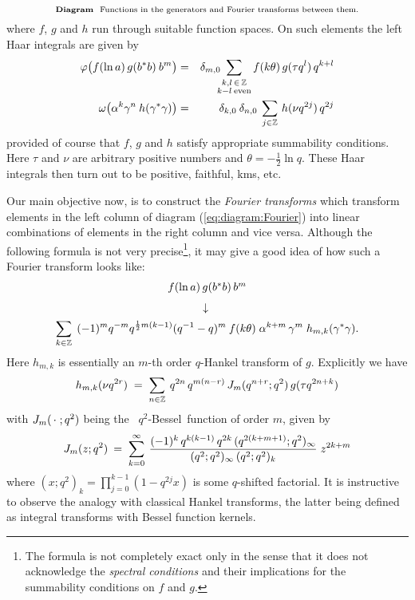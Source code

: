 \begin{equation}\label{eq:diagram:Fourier}
\mbox{\scriptsize {\bf Diagram}\hspace{3pt}\ Functions in the generators and Fourier transforms between them.}
\end{equation}
where $f$, $g$ and $h$ run through suitable function spaces.
On such elements the left Haar integrals are given by
\begin{eqnarray*}
  \varphi \!\left(  f(\ln a)\, g(b^* b)\: b^m  \vertM\right)
     &=& \delta_{m,0} \!\!\! \sum_{\stackrel{\scriptstyle k,l\,\in\, \ZZ}{\scriptstyle k-l\: {\rm even}}}
            f(k \theta) \, g(\tau q^l) \, q^{k+l}  \\
  \omega \!\left(\alpha^k \gamma^n \:  h(\gamma^*\gamma)\vertM\right)
           &=& \delta_{k,0}\:\delta_{n,0} \: \sum_{j\in\ZZ} \, h(\nu q^{2j})\, q^{2j}
\end{eqnarray*}
provided of course that $f$, $g$ and $h$ satisfy appropriate summability conditions.
Here $\tau$ and $\nu$ are arbitrary positive numbers and \mbox{$\theta = -\frac{1}{2} \ln q$}\@.
These Haar integrals then turn out to be positive, faithful, {\sc kms}, etc.
\vspace{1ex}

Our main objective now, is to construct the {\em Fourier transforms\/} which
transform elements in the left column of diagram (\ref{eq:diagram:Fourier})
into linear combinations of elements in the right column and vice versa.
Although the following formula is not very
precise\footnote{The formula is not completely exact only in the sense that it does
not acknowledge the {\em spectral conditions\/} and their
implications for the summability conditions on $f$ and $g$.},
it may give a good idea of how such a Fourier transform looks like:
$$ \begin{array}{c}
    f(\ln a)\, g(b^* b)\, b^m
\\
\downarrow\vertXL
\\  \displaystyle
    \sum_{k\in\ZZ} \:\: (-1)^m q^{-m} q^{\frac{1}{2}m(k-1)} (q^{-1}-q)^m \:
       f(k \theta) \;  \alpha^{k+m} \, \gamma^m \;  h_{m,k}(\gamma^*\gamma).\vertXL
\end{array}$$
Here $h_{m,k}$ is essentially an $m$-th order $q$-Hankel transform of $g$.
Explicitly we have
$$ h_{m,k}(\nu q^{2r})
       \;=\; \sum_{n\in\mathbb{Z}} \: q^{2n} \, q^{m(n-r)}\, J_{m}(q^{n+r}; q^2) \, g(\tau q^{2n+k}) $$
with $J_{m}(\,\cdot\;; q^2)$ being the \little\ \mbox{$q^2$-Bessel}\ function of order $m$,
given by
$$ J_{m}(z; q^2) \:=\; \sum_{k=0}^{\infty} \:  \frac{(-1)^k\,q^{k(k-1)}\,
     q^{2k}\,(q^{2(k+m+1)}; q^2)_\infty}{(q^2;q^2)_\infty  \,(q^2;q^2)_k} \; z^{2k+m} $$
where $(x;q^2)_k = \prod_{j=0}^{k-1} (1-q^{2j} x)$ is some $q$-shifted factorial.
It is instructive to observe the analogy with classical Hankel transforms,
the latter being defined as integral transforms with Bessel function kernels.
\vspace{1ex}


